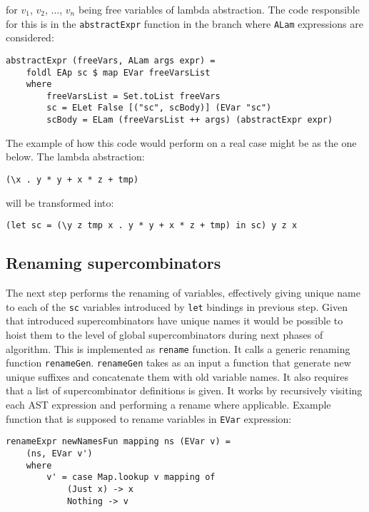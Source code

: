 \documentclass[a4paper]{report}
\begin{document}
for $v_1$, $v_2$, $\ldots$, $v_n$ being free variables of lambda abstraction.
The code responsible for this is in the \texttt{abstractExpr} function in the
branch where \texttt{ALam} expressions are considered:

\begin{lstlisting}
abstractExpr (freeVars, ALam args expr) =
    foldl EAp sc $ map EVar freeVarsList
    where
        freeVarsList = Set.toList freeVars
        sc = ELet False [("sc", scBody)] (EVar "sc")
        scBody = ELam (freeVarsList ++ args) (abstractExpr expr)
\end{lstlisting}

The example of how this code would perform on a real case might be as the one
below. The lambda abstraction:

\begin{lstlisting}
(\x . y * y + x * z + tmp)
\end{lstlisting}

will be transformed into:

\begin{lstlisting}
(let sc = (\y z tmp x . y * y + x * z + tmp) in sc) y z x
\end{lstlisting}

\subsection{Renaming supercombinators}
The next step performs the renaming of variables, effectively giving unique
name to each of the \texttt{sc} variables introduced by \texttt{let} bindings
in previous step. Given that introduced supercombinators have unique names it
would be possible to hoist them to the level of global supercombinators during
next phases of algorithm. This is implemented as \texttt{rename} function. It
calls a generic renaming function \texttt{renameGen}. \texttt{renameGen} takes
as an input a function that generate new unique suffixes and concatenate them
with old variable names. It also requires that a list of supercombinator
definitions is given. It works by recursively visiting each AST expression and
performing a rename where applicable. Example function that is supposed to
rename variables in \texttt{EVar} expression:

\begin{lstlisting}
renameExpr newNamesFun mapping ns (EVar v) =
    (ns, EVar v')
    where
        v' = case Map.lookup v mapping of
            (Just x) -> x
            Nothing -> v
\end{lstlisting}
\end{document}
